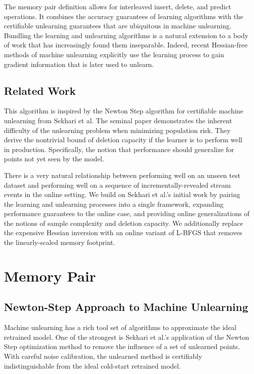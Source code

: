 \documentclass[a4paper,12pt]{article}
\begin{document}
The memory pair definition allows for interleaved insert, delete, and predict operations. It combines the accuracy guarantees of learning algorithms with the certifiable unlearning guarantees that are ubiquitous in machine unlearning. Bundling the learning and unlearning algorithms is a natural extension to a body of work that has increasingly found them inseparable. Indeed, recent Hessian-free methods of machine unlearning explicitly use the learning process to gain gradient information that is later used to unlearn.

\subsection{Related Work}

This algorithm is inspired by the Newton Step algorithm for certifiable machine unlearning from Sekhari et al. The seminal paper demonstrates the inherent difficulty of the unlearning problem when minimizing population risk. They derive the nontrivial bound of deletion capacity if the learner is to perform well in production. Specifically, the notion that performance should generalize for points not yet seen by the model.

There is a very natural relationship between performing well on an unseen test dataset and performing well on a sequence of incrementally-revealed stream events in the online setting. We build on Sekhari et al.'s initial work by pairing the learning and unlearning processes into a single framework, expanding performance guarantees to the online case, and providing online generalizations of the notions of sample complexity and deletion capacity. We additionally replace the expensive Hessian inversion with an online variant of L-BFGS that removes the linearly-scaled memory footprint.

\section{Memory Pair}
\label{sec:memory-pair}

\subsection{Newton-Step Approach to Machine Unlearning}

Machine unlearning has a rich tool set of algorithms to approximate the ideal retrained model. One of the strongest is Sekhari et al.'s application of the Newton Step optimization method to remove the influence of a set of unlearned points. With careful noise calibration, the unlearned method is certifiably indistinguishable from the ideal cold-start retrained model.
\end{document}
